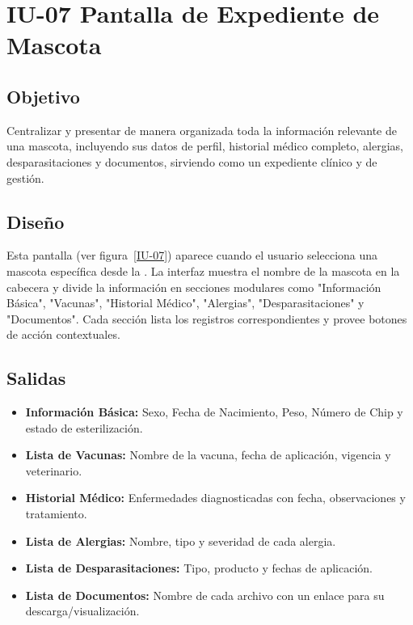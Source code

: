 \section{IU-07 Pantalla de Expediente de Mascota}

\subsection{Objetivo}
    Centralizar y presentar de manera organizada toda la información relevante de una mascota, incluyendo sus datos de perfil, historial médico completo, alergias, desparasitaciones y documentos, sirviendo como un expediente clínico y de gestión.

\subsection{Diseño}
    Esta pantalla  (ver figura~\ref{IU-07}) aparece cuando el usuario selecciona una mascota específica desde la . La interfaz muestra el nombre de la mascota en la cabecera y divide la información en secciones modulares como "Información Básica", "Vacunas", "Historial Médico", "Alergias", "Desparasitaciones" y "Documentos". Cada sección lista los registros correspondientes y provee botones de acción contextuales.

\subsection{Salidas}
\begin{itemize}
    \item \textbf{Información Básica:} Sexo, Fecha de Nacimiento, Peso, Número de Chip y estado de esterilización.
    \item \textbf{Lista de Vacunas:} Nombre de la vacuna, fecha de aplicación, vigencia y veterinario.
    \item \textbf{Historial Médico:} Enfermedades diagnosticadas con fecha, observaciones y tratamiento.
    \item \textbf{Lista de Alergias:} Nombre, tipo y severidad de cada alergia.
    \item \textbf{Lista de Desparasitaciones:} Tipo, producto y fechas de aplicación.
    \item \textbf{Lista de Documentos:} Nombre de cada archivo con un enlace para su descarga/visualización.
\end{itemize}

